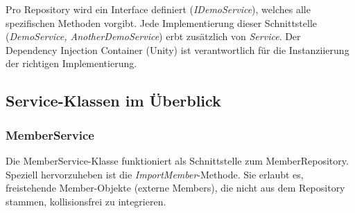 	Pro Repository wird ein Interface definiert (\textit{IDemoService}), welches alle spezifischen Methoden vorgibt. Jede Implementierung dieser Schnittstelle (\textit{DemoService, AnotherDemoService}) erbt zusätzlich von \textit{Service}. Der Dependency Injection Container (Unity) ist verantwortlich für die Instanziierung der richtigen Implementierung.
	
	
	\subsection{Service-Klassen im Überblick}
	

	
	\subsubsection{MemberService}
	
	Die MemberService-Klasse funktioniert als Schnittstelle zum MemberRepository. Speziell hervorzuheben ist die \textit{ImportMember}-Methode. Sie erlaubt es, freistehende Member-Objekte (externe Members), die nicht aus dem Repository stammen, kollisionsfrei zu integrieren.
	
